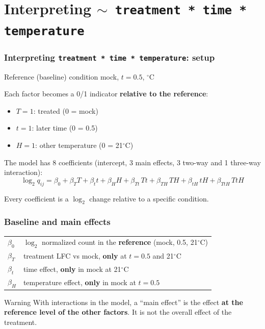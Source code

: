 \documentclass{beamer}
\begin{document}
\section{Interpreting \texttt{$\sim$ treatment * time * temperature}}
\begin{frame}
\frametitle{Interpreting \texttt{treatment * time * temperature}: setup}

\begin{block}{Reference (baseline) condition}
mock, \quad $t = 0.5$, $^\circ$C
\end{block}

\vspace{0.3cm}
Each factor becomes a 0/1 indicator \textbf{relative to the reference}:
\begin{itemize}
    \item $T = 1$: treated (0 = mock)
    \item $t = 1$: later time (0 = 0.5)
    \item $H = 1$: other temperature (0 = 21$^\circ$C)
\end{itemize}

\vspace{0.3cm}
The model has 8 coefficients (intercept, 3 main effects, 3 two-way and 1 three-way interaction):
\[
\log_2 q_{ij} = \beta_0 + \beta_T T + \beta_t t + \beta_H H
+ \beta_{Tt}\,Tt + \beta_{TH}\,TH + \beta_{tH}\,tH + \beta_{TtH}\,TtH
\]

\vspace{0.1cm}
\alert{Every coefficient is a $\log_2$ change relative to a specific condition.}
\end{frame}

\begin{frame}
\frametitle{Baseline and main effects}

\renewcommand{\arraystretch}{1.6}
\begin{tabular}{@{}ll@{}}
$\beta_0$ & $\log_2$ normalized count in the \textbf{reference} (mock, 0.5, 21$^\circ$C) \\
$\beta_T$ & treatment LFC vs mock, \textbf{only} at $t=0.5$ and 21$^\circ$C \\
$\beta_t$ & time effect, \textbf{only} in mock at 21$^\circ$C \\
$\beta_H$ & temperature effect, \textbf{only} in mock at $t=0.5$ \\
\end{tabular}

\vspace{0.5cm}
\begin{block}{Warning}
With interactions in the model, a ``main effect'' is the effect \textbf{at the reference level of the other factors}. It is not the overall effect of the treatment.
\end{block}
\end{frame}
\end{document}
